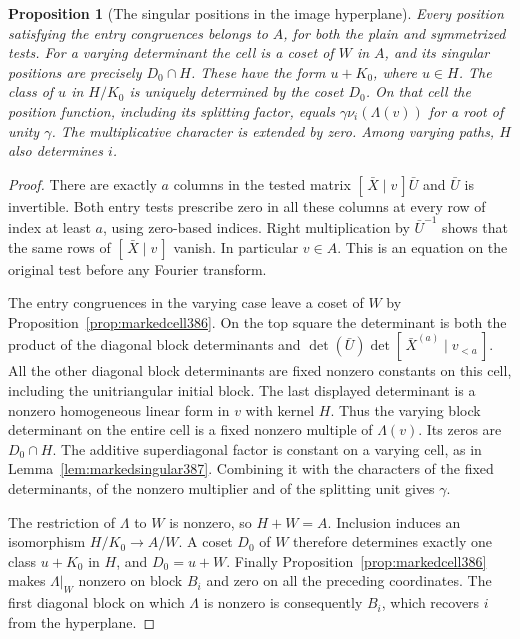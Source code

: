 \documentclass[a4paper,11pt]{article}
\newtheorem{proposition}{Proposition}[section]
\theoremstyle{definition}
\theoremstyle{remark}
\numberwithin{equation}{section}
\begin{document}
\begin{proposition}[The singular positions in the image hyperplane]
\label{prop:markedimage393}
Every position satisfying the entry congruences belongs to
\(A\), for both the plain and symmetrized tests. For a varying
determinant the cell is a coset of \(W\) in \(A\), and its
singular positions are precisely \(D_0\cap H\). These have the
form \(u+K_0\), where \(u\in H\). The class of \(u\) in
\(H/K_0\) is uniquely determined by the coset \(D_0\).
On that cell the position function, including its splitting
factor, equals \(\gamma\nu_i(\Lambda(v))\) for a root of unity
\(\gamma\). The multiplicative character is extended by zero.
Among varying paths, \(H\) also determines \(i\).
\end{proposition}
\begin{proof}
There are exactly \(a\) columns in the tested matrix
\([\,\bar X\mid v\,]\bar U\) and \(\bar U\) is invertible.
Both entry tests prescribe zero in all these columns at every
row of index at least \(a\), using zero-based indices.
Right multiplication by \(\bar U^{-1}\) shows that the same
rows of \([\,\bar X\mid v\,]\) vanish. In particular \(v\in A\).
This is an equation on the original test before any Fourier
transform.

The entry congruences in the varying case leave a coset of
\(W\) by Proposition~\ref{prop:markedcell386}. On the top
square the determinant is both the product of the diagonal
block determinants and
\(\det(\bar U)\det[\,\bar X^{(a)}\mid v_{<a}\,]\).
All the other diagonal block determinants are fixed nonzero
constants on this cell, including the unitriangular initial
block. The last displayed determinant is a nonzero homogeneous
linear form in \(v\) with kernel \(H\). Thus the varying
block determinant on the entire cell is a fixed nonzero
multiple of \(\Lambda(v)\). Its zeros are \(D_0\cap H\).
The additive superdiagonal factor is constant on a varying
cell, as in Lemma~\ref{lem:markedsingular387}. Combining
it with the characters of the fixed determinants, of the
nonzero multiplier and of the splitting unit gives \(\gamma\).

The restriction of \(\Lambda\) to \(W\) is nonzero, so
\(H+W=A\). Inclusion induces an isomorphism
\(H/K_0\longrightarrow A/W\). A coset \(D_0\) of \(W\)
therefore determines exactly one class \(u+K_0\) in \(H\),
and \(D_0=u+W\). Finally
Proposition~\ref{prop:markedcell386} makes \(\Lambda|_W\)
nonzero on block \(B_i\) and zero on all the preceding
coordinates. The first diagonal block on which \(\Lambda\)
is nonzero is consequently \(B_i\), which recovers \(i\)
from the hyperplane.
\end{proof}
\end{document}
